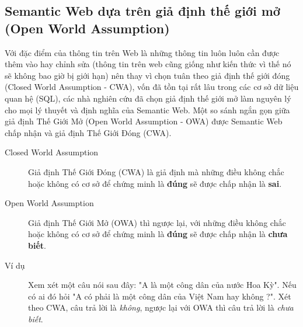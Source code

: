 \subsection{Semantic Web dựa trên giả định thế giới mở (Open World Assumption)} 
Với đặc điểm của thông tin trên Web là những thông tin luôn luôn cần được thêm vào hay chỉnh sửa (thông tin trên web cũng giống như kiến thức vì thế nó sẽ không bao giờ bị giới hạn) nên thay vì chọn tuân theo giả định thế giới đóng (Closed World Assumption - CWA), vốn đã tồn tại rất lâu trong các cơ sở dữ liệu quan hệ (SQL), các nhà nghiên cứu đã chọn giả định thế giới mở làm nguyên lý cho mọi lý thuyết và định nghĩa của Semantic Web. Một so sánh ngắn gọn giữa giả định Thế Giới Mở (Open World Assumption - OWA)\cite{OWA_0} được Semantic Web chấp nhận và giả định Thế Giới Đóng (CWA).
\begin{description}
	\item[Closed World Assumption] 
	Giả định Thế Giới Đóng (CWA) là giả định mà những điều không chắc hoặc không có cơ sở để chứng minh là \textbf{đúng} sẽ được chấp nhận là \textbf{sai}.
	\item[Open World Assumption]
	Giả định Thế Giới Mở (OWA) thì ngược lại, với những điều không chắc hoặc không có cơ sở để chứng minh là \textbf{đúng} sẽ được chấp nhận là \textbf{chưa biết}. 
	\item[Ví dụ]
	Xem xét một câu nói sau đây: "A là một công dân của nước Hoa Kỳ". Nếu có ai đó hỏi "A có phải là một công dân của Việt Nam hay không ?". Xét theo CWA, câu trả lời là \textit{không}, ngược lại với OWA thì câu trả lời là \textit{chưa biết}. 
\end{description}
%
